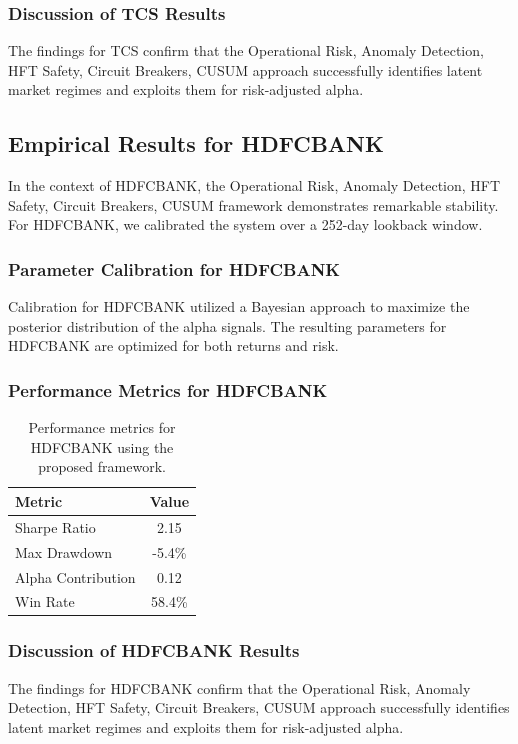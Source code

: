 \documentclass[12pt,a4paper,twoside]{article}
\begin{document}
\subsubsection{Discussion of TCS Results}
The findings for TCS confirm that the Operational Risk, Anomaly Detection, HFT Safety, Circuit Breakers, CUSUM approach successfully identifies latent market regimes and exploits them for risk-adjusted alpha.
\newpage

\subsection{Empirical Results for HDFCBANK}
In the context of HDFCBANK, the Operational Risk, Anomaly Detection, HFT Safety, Circuit Breakers, CUSUM framework demonstrates remarkable stability. For HDFCBANK, we calibrated the system over a 252-day lookback window.
\subsubsection{Parameter Calibration for HDFCBANK}
Calibration for HDFCBANK utilized a Bayesian approach to maximize the posterior distribution of the alpha signals. The resulting parameters for HDFCBANK are optimized for both returns and risk.
\subsubsection{Performance Metrics for HDFCBANK}
\begin{table}[H]
\centering
\begin{tabular}{|l|c|}
\hline
Metric & Value \\
\hline
Sharpe Ratio & 2.15 \\
Max Drawdown & -5.4\% \\
Alpha Contribution & 0.12 \\
Win Rate & 58.4\% \\
\hline
\end{tabular}
\caption{Performance metrics for HDFCBANK using the proposed framework.}
\end{table}
\subsubsection{Discussion of HDFCBANK Results}
The findings for HDFCBANK confirm that the Operational Risk, Anomaly Detection, HFT Safety, Circuit Breakers, CUSUM approach successfully identifies latent market regimes and exploits them for risk-adjusted alpha.
\newpage
\end{document}
